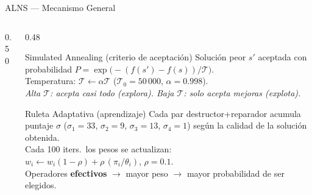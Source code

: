 \documentclass[aspectratio=169,10pt]{beamer}
\begin{document}
\begin{frame}{ALNS --- Mecanismo General}
\begin{columns}[T,onlytextwidth]
\begin{column}{0.50\textwidth}
    \end{column}
    \begin{column}{0.48\textwidth}
      \begin{block}{Simulated Annealing (criterio de aceptación)}\footnotesize
        Solución peor $s'$ aceptada con probabilidad
        $P{=}\exp\!\bigl(-(f(s'){-}f(s))/\mathcal{T}\bigr)$.\\[0.15em]
        Temperatura: $\mathcal{T}{\leftarrow}\alpha\mathcal{T}$
        ($\mathcal{T}_0{=}50\,000$, $\alpha{=}0.998$).\\[0.15em]
        \textit{Alta $\mathcal{T}$: acepta casi todo (explora).
        Baja $\mathcal{T}$: solo acepta mejoras (explota).}
      \end{block}
      \vspace{0.05em}
      \begin{block}{Ruleta Adaptativa (aprendizaje)}\footnotesize
        Cada par destructor+reparador acumula puntaje $\sigma$
        ($\sigma_1{=}33$, $\sigma_2{=}9$, $\sigma_3{=}13$, $\sigma_4{=}1$)
        según la calidad de la solución obtenida.\\[0.15em]
        Cada 100 iters.\ los pesos se actualizan:\\
        $w_i \leftarrow w_i(1{-}\rho)+\rho\,(\pi_i/\theta_i)$,\; $\rho{=}0.1$.\\[0.15em]
        Operadores \textbf{efectivos} $\to$ mayor peso $\to$
        mayor probabilidad de ser elegidos.
      \end{block}
    \end{column}
  \end{columns}
\end{frame}
\end{document}
